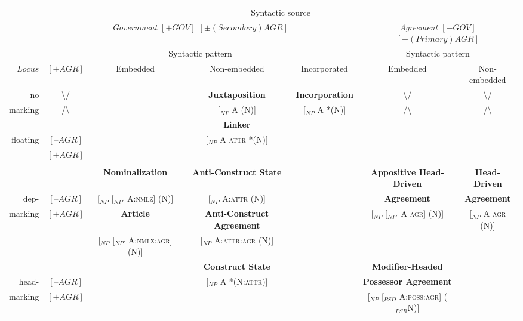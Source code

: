 \newpage
\begin{landscape}
\begin{table}
\begin{footnotesize}
\begin{tabular}{|| r || c | c | c | c || c | c ||}
\lsptoprule
			&\multicolumn{6}{c||}{Syntactic source}\\

			\cline{2-7}
			&\multicolumn{4}{c||}{{\it Government $[+GOV]$ $[±(Secondary)AGR]$}}&\multicolumn{2}{c||}{{\it Agreement $[-GOV]$ $[+(Primary)AGR]$}}\\
			\cline{2-7}
			&\multicolumn{4}{c||}{Syntactic pattern}&\multicolumn{2}{c||}{Syntactic pattern}\\
			\cline{2-7}
$Locus$		&$[±AGR]$	&Embedded	&Non-embedded			&Incorporated	&Embedded&Non-embedded\\
\lsptoprule
no			&\textbackslash/&			&{\bf Juxtaposition}						&{\bf Incorporation}			&\textbackslash/&\textbackslash/ \\
marking		&/\textbackslash&			&[$_{NP}$ A (N)]				&[$_{NP}$ A *(N)]&/\textbackslash&/\textbackslash\\
\lsptoprule
			& 			&			&{\bf Linker}						&			&			&\\
floating		&$[–AGR]$	&			&[$_{NP}$ A \textsc{attr} *(N)]	&			&			&\\
 			\cline{2-5}
			&$[+AGR]$	&			&							&			&			&\\
			&			&			&							&			&			&\\
\lsptoprule
			&			&{\bf Nominalization}&{\bf Anti-Construct State}			&	&{\bf Appositive Head-Driven}&{\bf Head-Driven}\\
dep-			&$[–AGR]$	&[$_{NP}$ [$_{NP'}$ A:\textsc{nmlz}] (N)]&[$_{NP}$ A:\textsc{attr} (N)]&&{\bf Agreement}&{\bf Agreement}\\		
			\cline{2-5}
marking		&$[+AGR]$	&{\bf Article}		&{\bf Anti-Construct Agreement}	&			&[$_{NP}$ [$_{NP'}$ A \textsc{agr}] (N)]&[$_{NP}$ A \textsc{agr} (N)]\\
			&&[$_{NP}$ [$_{NP'}$ A:\textsc{nmlz:agr}] (N)]&[$_{NP}$ A:\textsc{attr:agr} (N)]&&&\\
\lsptoprule
			&			&			&{\bf Construct State}						&			&{\bf Modifier-Headed }	&\\
head-		&$[–AGR]$	&			&[$_{NP}$ A *(N:\textsc{attr})]&&{\bf Possessor Agreement}&\\
			\cline{2-5}
marking		&$[+AGR]$	&			&							&&[$_{NP}$ [$_{PSD}$ A:\textsc{poss:agr}] ($_{PSR}$N)]&\\

\end{tabular}
\end{footnotesize}
\end{table}
\end{landscape}
